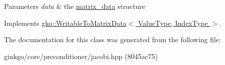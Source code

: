 \begin{DoxyParams}{Parameters}
{\em data} & the \hyperlink{structgko_1_1matrix__data}{matrix\+\_\+data} structure \\
\hline
\end{DoxyParams}


Implements \hyperlink{classgko_1_1WritableToMatrixData_a96036c3a4bf4c67fa93002808b8b14e2}{gko\+::\+Writable\+To\+Matrix\+Data$<$ Value\+Type, Index\+Type $>$}.



The documentation for this class was generated from the following file\+:\begin{DoxyCompactItemize}
\item 
ginkgo/core/preconditioner/jacobi.\+hpp (8045ac75)\end{DoxyCompactItemize}

